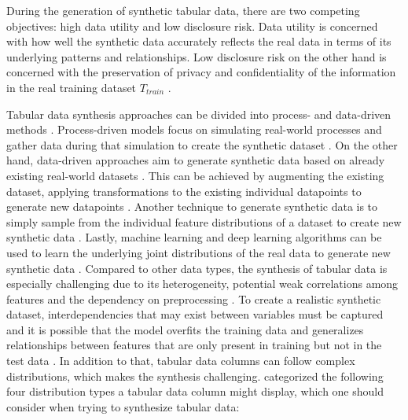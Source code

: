 During the generation of synthetic tabular data, there are two competing objectives: high data utility and low disclosure risk.
Data utility is concerned with how well the synthetic data accurately reflects the real data in terms of its underlying patterns and relationships.
Low disclosure risk on the other hand is concerned with the preservation of privacy and confidentiality of the information in the real training dataset $T_{train}$ \cite{little2021GenerativeAdversarialNetworksa}. 

Tabular data synthesis approaches can be divided into process- and data-driven methods \cite{goncalves2020GenerationEvaluationSynthetic}.
Process-driven models focus on simulating real-world processes and gather data during that simulation to create the synthetic dataset \cite{goncalves2020GenerationEvaluationSynthetic, kowalczyk2022TaxonomyUseSynthetic}.
On the other hand, data-driven approaches aim to generate synthetic data based on already existing real-world datasets \cite{goncalves2020GenerationEvaluationSynthetic, kowalczyk2022TaxonomyUseSynthetic}.
This can be achieved by augmenting the existing dataset, \ie applying transformations to the existing individual datapoints to generate new datapoints \cite{kowalczyk2022TaxonomyUseSynthetic}.
Another technique to generate synthetic data is to simply sample from the individual feature distributions of a dataset to create new synthetic data \cite{kowalczyk2022TaxonomyUseSynthetic}.
Lastly, machine learning and deep learning algorithms can be used to learn the underlying joint distributions of the real data to generate new synthetic data \cite{kowalczyk2022TaxonomyUseSynthetic}. 
Compared to other data types, the synthesis of tabular data is especially challenging due to its heterogeneity, potential weak correlations among features and the dependency on preprocessing \cite{borisov2022DeepNeuralNetworks, yoon2020VIMEExtendingSuccess, gorishniy2022EmbeddingsNumericalFeatures}.
To create a realistic synthetic dataset, interdependencies that may exist between variables must be captured and 
it is possible that the model overfits the training data and generalizes relationships between features that are only present in training but not in the test data \cite{lederrey2022DATGANIntegratingExperta}.
In addition to that, tabular data columns can follow complex distributions, which makes the synthesis challenging.
\textcite{zhao2022CTABGANEnhancingTabular} categorized the following four distribution types a tabular data column might display, which one should consider when trying to synthesize tabular data:

